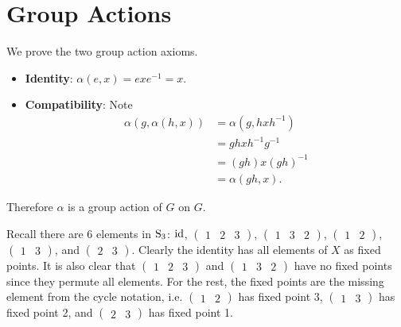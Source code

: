 \section{Group Actions}
\begin{questions}
    \item We prove the two group action axioms.
    \begin{itemize}
        \item \textbf{Identity}: $\alpha(e, x) = exe^{-1} = x$.
        \item \textbf{Compatibility}: Note
        \begin{align*}
            \alpha(g, \alpha(h, x)) &= \alpha(g, hxh^{-1})\\
            &= gh x h^{-1}g^{-1}\\
            &= (gh)x(gh)^{-1}\\
            &= \alpha(gh, x).
        \end{align*}
    \end{itemize}
    Therefore $\alpha$ is a group action of $G$ on $G$.

    \item Recall there are 6 elements in $\mathrm{S}_{3}$: $\mathrm{id}$, $\begin{pmatrix}1 & 2 & 3\end{pmatrix}$, $\begin{pmatrix}1 & 3 & 2\end{pmatrix}$, $\begin{pmatrix}1 & 2\end{pmatrix}$, $\begin{pmatrix}1 & 3\end{pmatrix}$, and $\begin{pmatrix}2 & 3\end{pmatrix}$. Clearly the identity has all elements of $X$ as fixed points. It is also clear that $\begin{pmatrix}1 & 2 & 3\end{pmatrix}$ and $\begin{pmatrix}1 & 3 & 2\end{pmatrix}$ have no fixed points since they permute all elements. For the rest, the fixed points are the missing element from the cycle notation, i.e. $\begin{pmatrix}1 & 2\end{pmatrix}$ has fixed point 3, $\begin{pmatrix}1 & 3\end{pmatrix}$ has fixed point 2, and $\begin{pmatrix}2 & 3\end{pmatrix}$ has fixed point 1.


\end{questions}
